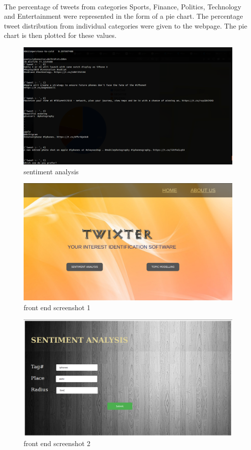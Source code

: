 \paragraph{} The percentage of tweets from categories Sports, Finance, Politics, Technology and Entertainment were represented in the form of a pie chart. The percentage tweet distribution from individual categories were given to the webpage. The pie chart is then plotted for these values.

\begin{figure}[!ht]
	\centering
	\includegraphics[width=0.9\linewidth]{sentiment_server.png}
	\caption{sentiment analysis}
	\label{fig:expression01}
\end{figure}


\begin{figure}[h]
	\centering
	\includegraphics[width=0.9\linewidth]{image1.png}
	\caption{front end screenshot 1}
	\label{fig:expression01}
\end{figure}

\begin{figure}[h]
	\centering
	\includegraphics[width=0.9\linewidth]{image2.png}
	\caption{front end screenshot 2}
	\label{fig:expression01}
\end{figure}

